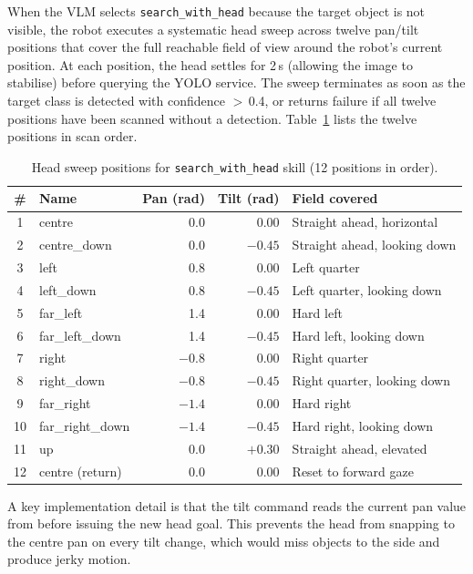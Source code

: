 When the VLM selects \texttt{search\_with\_head} because the target object is
not visible, the robot executes a systematic head sweep across twelve pan/tilt
positions that cover the full reachable field of view around the robot's
current position.
At each position, the head settles for 2\,s (allowing the image to stabilise)
before querying the YOLO service.
The sweep terminates as soon as the target class is detected with
confidence $>$\,0.4, or returns failure if all twelve positions have been
scanned without a detection.
Table~\ref{tab:search_positions} lists the twelve positions in scan order.

\begin{table}[H]
\centering
\caption{Head sweep positions for \texttt{search\_with\_head} skill (12 positions in order).}
\label{tab:search_positions}
\small
\begin{tabular}{clrrp{4.5cm}}
\toprule
\textbf{\#} & \textbf{Name} & \textbf{Pan (rad)} & \textbf{Tilt (rad)} & \textbf{Field covered} \\
\midrule
1  & centre          &  0.0  &  0.00  & Straight ahead, horizontal \\
2  & centre\_down    &  0.0  & $-0.45$  & Straight ahead, looking down \\
3  & left            &  0.8  &  0.00  & Left quarter \\
4  & left\_down      &  0.8  & $-0.45$  & Left quarter, looking down \\
5  & far\_left       &  1.4  &  0.00  & Hard left \\
6  & far\_left\_down &  1.4  & $-0.45$  & Hard left, looking down \\
7  & right           & $-0.8$  &  0.00  & Right quarter \\
8  & right\_down     & $-0.8$  & $-0.45$  & Right quarter, looking down \\
9  & far\_right      & $-1.4$  &  0.00  & Hard right \\
10 & far\_right\_down & $-1.4$ & $-0.45$ & Hard right, looking down \\
11 & up              &  0.0  & $+0.30$ & Straight ahead, elevated \\
12 & centre (return) &  0.0  &  0.00  & Reset to forward gaze \\
\bottomrule
\end{tabular}
\normalsize
\end{table}

A key implementation detail is that the tilt command reads the current pan
value from  before issuing the new head goal.
This prevents the head from snapping to the centre pan on every tilt change,
which would miss objects to the side and produce jerky motion.

